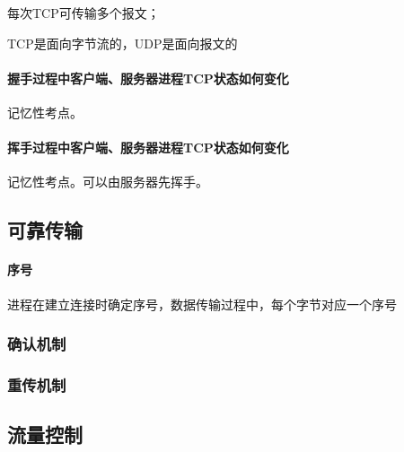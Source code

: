 每次TCP可传输多个报文；

TCP是面向字节流的，UDP是面向报文的

\paragraph{握手过程中客户端、服务器进程TCP状态如何变化}
记忆性考点。

\paragraph{挥手过程中客户端、服务器进程TCP状态如何变化}
记忆性考点。可以由服务器先挥手。


\subsection{可靠传输}

\paragraph{序号}
进程在建立连接时确定序号，数据传输过程中，每个字节对应一个序号

\subsubsection{确认机制}


\subsubsection{重传机制}


\subsection{流量控制}



































































